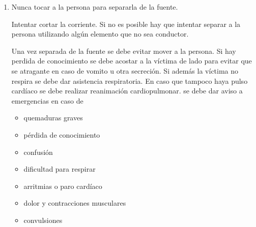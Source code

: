 \begin{enumerate}[resume]
     \begin{images}[\label{imagenmultiple}]{Umbral de atrapamiento y fibrilación en funcion de la frecuencia.}
    
    \end{images}
    
    El umbral de atrapamiento para una corriente de 50 Hz es de 10 mA y el umbral de fibrilación es de 40 mA.
    Con esto se puede obtener los umbrales para distintas frecuencias de la siguiente forma.
    
    \begin{equation}
        \text{Umbral a la frecuencia estudiada} = F_f \cdot \text{Umbral a la frecuencia de 50 Hz}
    \end{equation}
     
     Como $F_f$ es siempre mayor a uno, se tiene que los umbrales a la frecuencia estudiada son mayores a los umbrales para 50 Hz y por lo tanto las corrientes a mayores frecuencias son menos peligrosas. Sin embargo estas presentan un mayor efecto térmico.
     
     \item %
     Nunca tocar a la persona para separarla de la fuente. 
     
     Intentar cortar la corriente. Si no es posible hay que intentar separar a la persona utilizando algún elemento que no sea conductor. 
     
     Una vez separada de la fuente se debe evitar mover a la persona. 
     Si hay perdida de conocimiento se debe acostar a la víctima de lado para evitar que se atragante en caso de vomito u otra secreción. Si además la víctima no respira se debe dar asistencia respiratoria. En caso que tampoco haya pulso cardíaco se debe realizar reanimación cardiopulmonar.
     se debe dar aviso a emergencias en caso de 
     \begin{itemize}
         \item quemaduras graves
         \item pérdida de conocimiento
         \item confusión
         \item dificultad para respirar
         \item arritmias o paro cardíaco
         \item dolor y contracciones musculares
         \item convulsiones
     \end{itemize}
     
\end{enumerate}